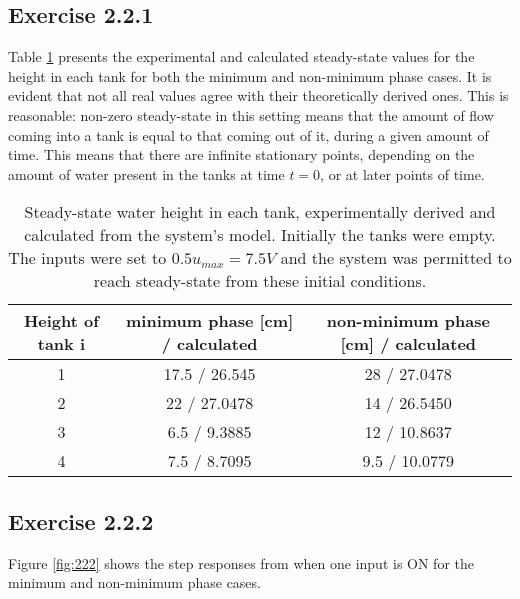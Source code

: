 \subsection*{Exercise 2.2.1}

Table \ref{tbl:221} presents the experimental and calculated steady-state values
for the height in each tank for both the minimum and non-minimum phase cases.
It is evident that not all real values agree with their theoretically derived
ones. This is reasonable: non-zero steady-state in this setting means that the
amount of flow coming into a tank is equal to that coming out of it, during a
given amount of time. This means that there are infinite stationary points,
depending on the amount of water present in the tanks at time $t=0$, or at later
points of time.

\begin{table}[H]\centering
  \begin{tabular}{c|c|c}
    Height of tank i & minimum phase [cm] / calculated & non-minimum phase [cm] / calculated\\ \hline
    1                & 17.5 / 26.545      & 28 / 27.0478           \\
    2                & 22 / 27.0478       & 14 / 26.5450           \\
    3                & 6.5 / 9.3885       & 12 / 10.8637            \\
    4                & 7.5 / 8.7095       & 9.5 / 10.0779           \\
    \end{tabular}
    \caption{Steady-state water height in each tank, experimentally derived and
      calculated from the system's model. Initially the tanks were
      empty. The inputs were set to $0.5 u_{max} = 7.5 V$ and the system was
      permitted to reach steady-state from these initial conditions.}
    \label{tbl:221}
\end{table}



\subsection*{Exercise 2.2.2}

Figure \ref{fig:222} shows the step responses from when one input is ON for
the minimum and non-minimum phase cases.

